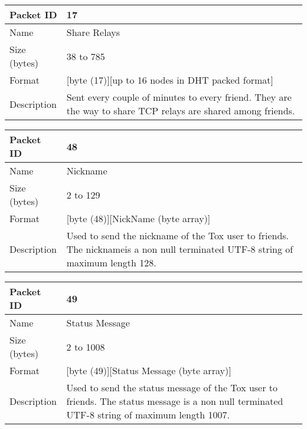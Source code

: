 \documentclass{tox}
\begin{document}
\begin{tabular}[pos]{|l|p{9cm}|}

\hline
Packet ID       &      17
\\ \hline
Name            &      Share Relays
\\
\hline
Size (bytes)    &      38 to 785
\\ \hline
Format          &      [byte (17)][up to 16 nodes in DHT packed format]
\\ \hline
Description     &      Sent every couple of minutes to every friend. They are 
                       the way to share TCP relays are shared among friends.
\\ \hline

\end{tabular}

\begin{tabular}[pos]{|l|p{9cm}|}

\hline
Packet ID       &      48
\\ \hline
Name            &      Nickname
\\ \hline
Size (bytes)    &      2 to 129
\\ \hline
Format          &      [byte (48)][NickName            (byte array)]
\\ \hline
Description     &      Used to send the nickname of the Tox user to friends. 
                       The nicknameis a non null terminated UTF-8 string of 
                       maximum length 128.
\\ \hline

\end{tabular}

\begin{tabular}[pos]{|l|p{9cm}|}

\hline
Packet ID       &      49
\\ \hline
Name            &      Status Message
\\ \hline
Size (bytes)    &      2 to 1008
\\ \hline
Format          &      [byte (49)][Status Message (byte array)]
\\ \hline
Description     &      Used to send the status message of the Tox user to 
                       friends. The status message is a non null terminated 
                       UTF-8 string of maximum length 1007.
\\ \hline

\end{tabular}
\end{document}
